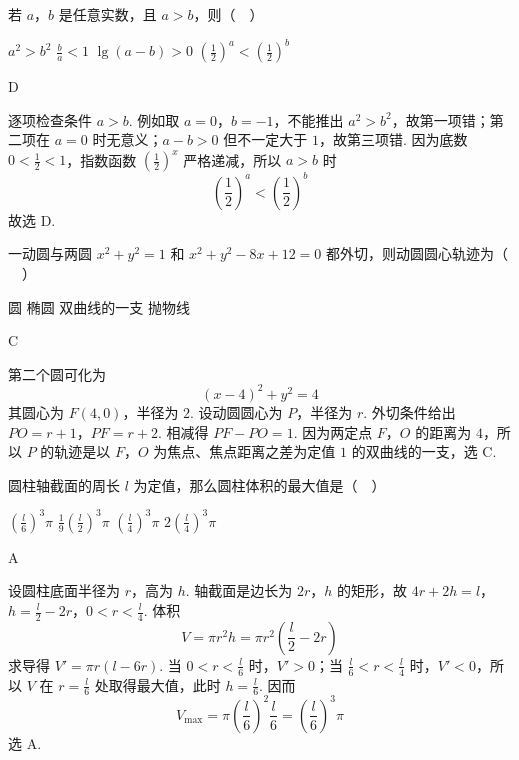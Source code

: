 \begin{problem}
若 \(a\)，\(b\) 是任意实数，且 \(a>b\)，则（\(\quad\)）

\choices
    {\(a^2>b^2\)}
    {\(\frac{b}{a}<1\)}
    {\(\lg \left(a-b\right)>0\)}
    {\(\left(\frac{1}{2}\right)^a<\left(\frac{1}{2}\right)^b\)}
\end{problem}

\begin{answer}
D
\end{answer}

\begin{solution}
逐项检查条件 \(a>b\). 例如取 \(a=0\)，\(b=-1\)，不能推出 \(a^2>b^2\)，故第一项错；第二项在 \(a=0\) 时无意义；\(a-b>0\) 但不一定大于 \(1\)，故第三项错. 因为底数 \(0<\frac12<1\)，指数函数 \(\left(\frac12\right)^x\) 严格递减，所以 \(a>b\) 时
\[
\left(\frac12\right)^a<\left(\frac12\right)^b
\]
故选 D.
\end{solution}

\begin{problem}
一动圆与两圆 \(x^2+y^2=1\) 和 \(x^2+y^2-8x+12=0\) 都外切，则动圆圆心轨迹为（\(\quad\)）

\choices
    {圆}
    {椭圆}
    {双曲线的一支}
    {抛物线}
\end{problem}

\begin{answer}
C
\end{answer}

\begin{solution}
第二个圆可化为
\[
(x-4)^2+y^2=4
\]
其圆心为 \(F(4,0)\)，半径为 \(2\). 设动圆圆心为 \(P\)，半径为 \(r\). 外切条件给出
\(PO=r+1\)，\(PF=r+2\).
相减得 \(PF-PO=1\). 因为两定点 \(F\)，\(O\) 的距离为 \(4\)，所以 \(P\) 的轨迹是以 \(F\)，\(O\) 为焦点、焦点距离之差为定值 \(1\) 的双曲线的一支，选 C.
\end{solution}

\begin{problem}
圆柱轴截面的周长 \(l\) 为定值，那么圆柱体积的最大值是（\(\quad\)）

\choices
    {\(\left(\frac{l}{6}\right)^3\pi\)}
    {\(\frac{1}{9}\left(\frac{l}{2}\right)^3\pi\)}
    {\(\left(\frac{l}{4}\right)^3\pi\)}
    {\(2\left(\frac{l}{4}\right)^3\pi\)}
\end{problem}

\begin{answer}
A
\end{answer}

\begin{solution}
设圆柱底面半径为 \(r\)，高为 \(h\). 轴截面是边长为 \(2r\)，\(h\) 的矩形，故
\(4r+2h=l\)，\(h=\frac l2-2r\)，\(0<r<\frac l4\).
体积
\[
V=\pi r^2h=\pi r^2\left(\frac l2-2r\right)
\]
求导得 \(V'=\pi r(l-6r)\). 当 \(0<r<\frac{l}{6}\) 时，\(V'>0\)；当 \(\frac{l}{6}<r<\frac{l}{4}\) 时，\(V'<0\)，所以 \(V\) 在 \(r=\frac{l}{6}\) 处取得最大值，此时 \(h=\frac{l}{6}\). 因而
\[
V_{\max}=\pi\left(\frac l6\right)^2\frac l6=\left(\frac l6\right)^3\pi
\]
选 A.
\end{solution}

